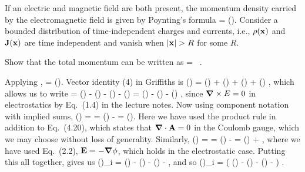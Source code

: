 \begin{statement}{}
	If an electric and magnetic field are both present, the momentum density carried by the electromagnetic field is given by Poynting's formula
	\beq
		\vcP =  (\vE \times \vB).
	\eeq
	Consider a bounded distribution of time-independent charges and currents, i.e., $\rho(\vb{x})$ and $\vb{J}(\vb{x})$ are time independent and vanish when $\abs{\vb{x}} > R$ for some $R$.
\end{statement}

\begin{problem}
	Show that the total momentum can be written as
	\beq
		\vP \equiv \int \vcPx \dcx
		= \int \phix \, \vJx \dcx.
	\eeq
\end{problem}

\begin{solution}
	Applying ,
	\beq
		\vE \times \vB = \vE \times (\grad \times \vA).
	\eeq
	Vector identity (4) in Griffiths is
	\beq
		\grad(\vaa \cdot \vbb) = \vaa \times (\grad \times \vbb) + \vbb \times (\grad \times \vaa) + (\vaa \cdot \grad) \vbb + (\vbb \cdot \grad) \vaa,
	\eeq
	which allows us to write
	\beqn \label{thingy1}
		\vE \times \vB = \grad(\vA \cdot \vE) - \vA \times (\grad \times \vE) - (\vA \cdot \grad) \vE - (\vE \cdot \grad) \vA
		= \grad(\vA \cdot \vE) - (\vA \cdot \grad) \vE - (\vE \cdot \grad) \vA,
	\eeqn
	since $\grad \times E = 0$ in electrostatics by Eq.~(1.4) in the lecture notes.  Now using component notation with implied sums,
	\beq
		(\vA \cdot \grad) \Ei = \Aj \pdv{\Ei}{\xj} = \pdv{}{\xj} (\Aj \Ei) - \Ei \pdv{\Aj}{\xj}
		= \pdv{}{\xj} (\Aj \Ei).
	\eeq
	Here we have used the product rule in addition to Eq.~(4.20), which states that $\grad \cdot \vb{A} = 0$ in the Coulomb gauge, which we may choose without loss of generality.  Similarly,
	\beq
		(\vE \cdot \grad) \Ai = \Ej \pdv{\Ai}{\xj} = \pdv{}{\xj} (\Ej \Ai) - \Ai \pdv{\Ej}{\xj}
		= \pdv{}{\xj} (\Ej \Ai) + \Ai \lap\phi,
	\eeq
	where we have used Eq.~(2.2), $\vb{E} = -\grad\phi$, which holds in the electrostatic case.  Putting this all together,  gives us
	\beq
		(\vE \times \vB)_i = \pdv{}{\xi} (\Aj \Ej) - \pdv{}{\xj} (\Aj \Ei) - \pdv{}{\xj} (\Ej \Ai) - \Ai \lap\phi,
	\eeq
	and so
	\beqn \label{thingy2}
		\int (\vE \times \vB)_i \dcx = \int \left( \pdv{}{\xi} (\Aj \Ej) - \pdv{}{\xj} (\Aj \Ei) - \pdv{}{\xj} (\Ej \Ai) - \Ai \lap\phi \right) \dcx.
	\eeqn
	

\end{solution}
